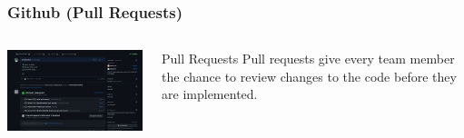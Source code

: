 \documentclass[aspectratio=169]{beamer}
\begin{document}
\begin{frame}
    \frametitle{Github (Pull Requests)}

    \begin{columns}
        \begin{column}{0.58\textwidth}
            \includegraphics[width=9cm]{pullrequest.png}
        \end{column}
        \begin{column}{0.28\textwidth}
            \begin{block}{Pull Requests}
                Pull requests give every team member the chance to review changes
                to the code before they are implemented.
            \end{block}
        \end{column}
    \end{columns}

\end{frame}
\end{document}
